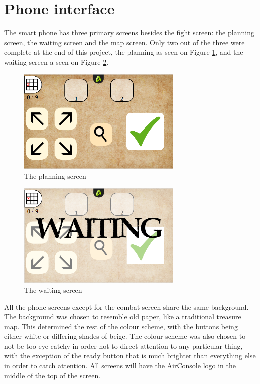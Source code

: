 
\section{Phone interface}
The smart phone has three primary screens besides the fight screen: the planning screen, the waiting screen and the map screen. Only two out of the three were complete at the end of this project, the planning as seen on Figure \ref{fig:plan}, and the waiting screen a seen on Figure \ref{fig:wait}. 

\begin{figure}[h!]
	\centering
	\includegraphics[width=0.7\textwidth]{figures/planningScreen.png}
	\caption{The planning screen}
	\label{fig:plan}
\end{figure}


\begin{figure}[h!]
	\centering
	\includegraphics[width=0.7\textwidth]{figures/waitingScreen.png}
	\caption{The waiting screen}
	\label{fig:wait}
\end{figure}

All the phone screens except for the combat screen share the same background. The background was chosen to resemble old paper, like a traditional treasure map. This determined the rest of the colour scheme, with the buttons being either white or differing shades of beige. The colour scheme was also chosen to not be too eye-catchy in order not to direct attention to any particular thing, with the exception of the ready button that is much brighter than everything else in order to catch attention. All screens will have the AirConsole logo in the middle of the top of the screen. 

